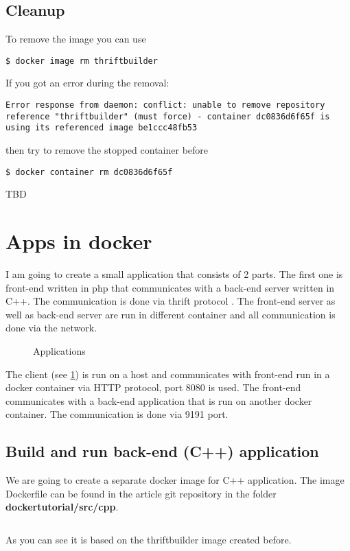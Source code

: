 \documentclass[14pt,a4paper]{article}
\begin{document}
\subsection{Cleanup}
To remove the image you can use
\begin{verbatim}
$ docker image rm thriftbuilder
\end{verbatim}
If you got an error during the removal:
\begin{verbatim}
Error response from daemon: conflict: unable to remove repository
reference "thriftbuilder" (must force) - container dc0836d6f65f is
using its referenced image be1ccc48fb53
\end{verbatim}
then try to remove the stopped container before
\begin{verbatim}
$ docker container rm dc0836d6f65f
\end{verbatim}
TBD

\section{Apps in docker}
I am going to create a small application that consists of 2 parts. The
first one is front-end written in php that communicates with a back-end server
written in C++. The communication is done via thrift protocol
\cite{apache:thrift}. The front-end server as well as back-end server
are run in different container and all communication is done via the
network. 

\begin{figure}
  \centering
{} 
  \caption{Applications}
  \label{fig:apps}
\end{figure}
The client (see \ref{fig:apps}) is run on a host and communicates
with front-end run in a docker container via HTTP protocol, port 8080
is used. The front-end communicates with a back-end application that
is run on another docker container. The communication is done via 9191
port. 

\subsection{Build and run back-end (C++) application}
We are going to create a separate docker image for C++ application.
The image Dockerfile can be found in the article git
repository \cite{github:articles_ivanmurashko} in the folder 
\textbf{dockertutorial/src/cpp}.
\inputminted{shell}{./src/cpp/Dockerfile}
As you can see it is based on the thriftbuilder image created before. 
\end{document}
